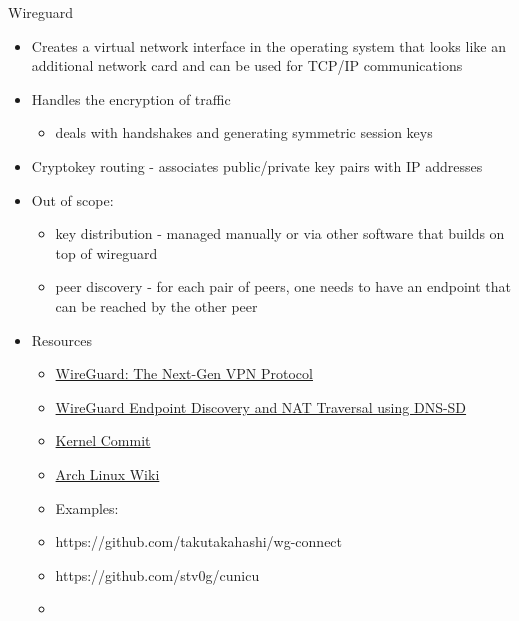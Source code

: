 \begin{block}{Wireguard}
\begin{Shaded}
\begin{Highlighting}[]
\KeywordTok{[Peer]}
\OtherTok{=}
\OtherTok{=}
\OtherTok{=}
\OtherTok{=}\StringTok{ }
\end{Highlighting}
\end{Shaded}

\begin{itemize}
\tightlist
\item
  Creates a virtual network interface in the operating system that looks
  like an additional network card and can be used for TCP/IP
  communications
\item
  Handles the encryption of traffic

  \begin{itemize}
  \tightlist
  \item
    deals with handshakes and generating symmetric session keys
  \end{itemize}
\item
  Cryptokey routing - associates public/private key pairs with IP
  addresses
\item
  Out of scope:

  \begin{itemize}
  \tightlist
  \item
    key distribution - managed manually or via other software that
    builds on top of wireguard
  \item
    peer discovery - for each pair of peers, one needs to have an
    endpoint that can be reached by the other peer
  \end{itemize}
\item
  Resources

  \begin{itemize}
  \tightlist
  \item
    \href{https://blogs.keysight.com/blogs/tech/nwvs.entry.html/2022/09/22/wireguard_the_next-genvpnprotocol-OcEz.html}{WireGuard:
    The Next-Gen VPN Protocol}
  \item
    \href{https://www.jordanwhited.com/posts/wireguard-endpoint-discovery-nat-traversal/}{WireGuard
    Endpoint Discovery and NAT Traversal using DNS-SD}
  \item
    \href{https://git.kernel.org/pub/scm/linux/kernel/git/torvalds/linux.git/commit/?id=e7096c131e5161fa3b8e52a650d7719d2857adfd}{Kernel
    Commit}
  \item
    \href{https://wiki.archlinux.org/title/WireGuard}{Arch Linux Wiki}
  \item
    Examples:
  \item
    https://github.com/takutakahashi/wg-connect
  \item
    https://github.com/stv0g/cunicu
  \item
  \end{itemize}
\end{itemize}
\end{block}

